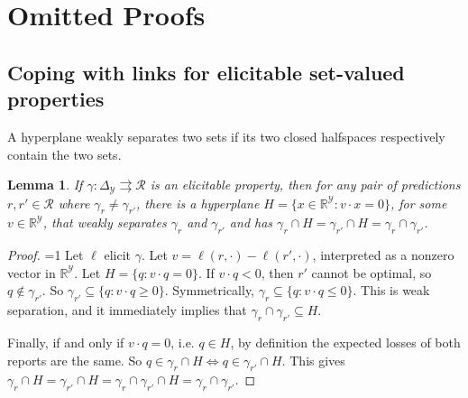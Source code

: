 \documentclass{article}
\newcommand{\Comments}{1}
\newcommand{\mytodo}[2]{\ifnum\Comments=1%
	\todo[linecolor=#1!80!black,backgroundcolor=#1,bordercolor=#1!80!black]{#2}\fi}
\newcommand{\btw}[1]{\mytodo{gray!10!white}{\textcolor{gray}{BTW: #1}}}%
\newcommand{\reals}{\mathbb{R}}
\newcommand{\simplex}{\Delta_\Y}
\newcommand{\R}{\mathcal{R}}
\newcommand{\Y}{\mathcal{Y}}
\newcommand{\toto}{\rightrightarrows}
\newtheorem{lemma}{Lemma}
\begin{document}
\section{Omitted Proofs}\label{app:omitted-proofs}

\subsection{Coping with links for elicitable set-valued properties}
A hyperplane weakly separates two sets if its two closed halfspaces respectively contain the two sets.
\begin{lemma}\label{lem:intersect-levelsets}
	If $\gamma: \simplex \toto \R$ is an elicitable property, then for any pair of predictions $r, r' \in \R$ where $\gamma_r \neq \gamma_{r'}$, there is a hyperplane $H = \{x \in \reals^{\Y} : v \cdot x = 0\}$, for some $v \in \reals^\Y$, that weakly separates $\gamma_r$ and $\gamma_{r'}$ and has $\gamma_r \cap H = \gamma_{r'} \cap H = \gamma_r \cap \gamma_{r'}$.
\end{lemma}
\begin{proof}
	\btw{Bo: the proof holds as written for the case where the level sets have empty intersection.}
	Let $\ell$ elicit $\gamma$.
	Let $v = \ell(r, \cdot) - \ell(r', \cdot)$, interpreted as a nonzero vector in $\reals^\Y$.
	Let $H = \{ q : v \cdot q = 0 \}$.
	If $v \cdot q < 0$, then $r'$ cannot be optimal, so $q \not\in \gamma_{r'}$.
	So $\gamma_{r'} \subseteq \{ q : v \cdot q \geq 0 \}$.
	Symmetrically, $\gamma_r \subseteq \{ q : v \cdot q \leq 0 \}$.
	This is weak separation, and it immediately implies that $\gamma_r \cap \gamma_{r'} \subseteq H$.
	
	Finally, if and only if $v \cdot q = 0$, i.e. $q \in H$, by definition the expected losses of both reports are the same.
	So $q \in \gamma_r \cap H \iff q \in \gamma_{r'} \cap H$.
	This gives $\gamma_r \cap H = \gamma_{r'} \cap H = \gamma_r \cap \gamma_{r'} \cap H = \gamma_r \cap \gamma_{r'}$.
\end{proof}
\end{document}
